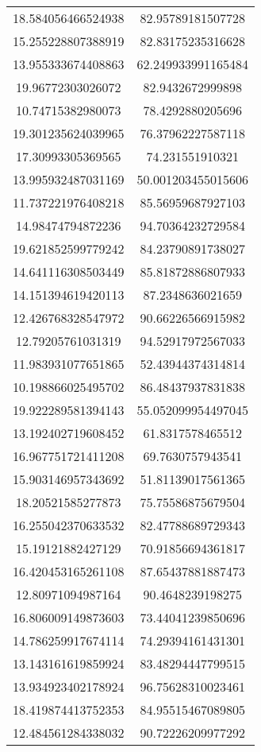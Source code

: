 \begin{table}
\begin{tabular}{cc}
18.584056466524938 & 82.95789181507728 \\
15.255228807388919 & 82.83175235316628 \\
13.955333674408863 & 62.249933991165484 \\
19.96772303026072 & 82.9432672999898 \\
10.74715382980073 & 78.4292880205696 \\
19.301235624039965 & 76.37962227587118 \\
17.30993305369565 & 74.231551910321 \\
13.995932487031169 & 50.001203455015606 \\
11.737221976408218 & 85.56959687927103 \\
14.98474794872236 & 94.70364232729584 \\
19.621852599779242 & 84.23790891738027 \\
14.641116308503449 & 85.81872886807933 \\
14.151394619420113 & 87.2348636021659 \\
12.426768328547972 & 90.66226566915982 \\
12.79205761031319 & 94.52917972567033 \\
11.983931077651865 & 52.43944374314814 \\
10.198866025495702 & 86.48437937831838 \\
19.922289581394143 & 55.052099954497045 \\
13.192402719608452 & 61.8317578465512 \\
16.967751721411208 & 69.7630757943541 \\
15.903146957343692 & 51.81139017561365 \\
18.20521585277873 & 75.75586875679504 \\
16.255042370633532 & 82.47788689729343 \\
15.19121882427129 & 70.91856694361817 \\
16.420453165261108 & 87.65437881887473 \\
12.80971094987164 & 90.4648239198275 \\
16.806009149873603 & 73.44041239850696 \\
14.786259917674114 & 74.29394161431301 \\
13.143161619859924 & 83.48294447799515 \\
13.934923402178924 & 96.75628310023461 \\
18.419874413752353 & 84.95515467089805 \\
12.484561284338032 & 90.72226209977292 \\

\end{tabular}
\end{table}
